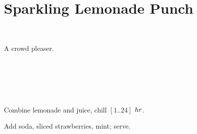 \section[Lemonade Punch]{Sparkling Lemonade Punch}~

\begin{recipestats}[
        servings=8,
        preptime=10~\minute,
        inactivetime=1~\hour,
        source=The~Gieskens,
    ]
\end{recipestats}

\begin{recipeabstract}
    A crowd pleaser.
\end{recipeabstract}

\begin{ingredientcolumns}[1]
    \begin{ingredientblock}
        \\
        \\
        \\
        \\
    \end{ingredientblock}
\end{ingredientcolumns}

\begin{preparation}
\item Combine lemonade and juice, chill $[1 .. 24]$ $\hour$.
\item Add soda, sliced strawberries, mint; serve.
\end{preparation}

\recipeend%
